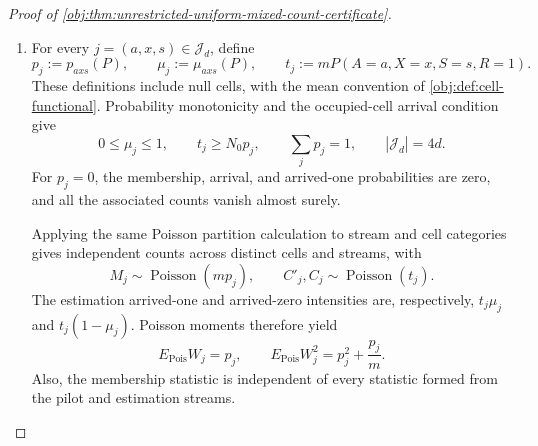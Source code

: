 \documentclass[11pt]{article}
\begin{document}
\begin{proof}[Proof of \cref{obj:thm:unrestricted-uniform-mixed-count-certificate}]
\begin{enumerate}
For the capped auxiliary output, conditional averaging gives
\[
\begin{aligned}
&E_\omega\!\left[
(\widetilde\tau(\mathbf O_n;\omega)-\Phi(P))^2
\mid\mathbf O_n\right]\\
&\quad=
(\widehat\tau^{\mathrm{mix}}_{n,d,q}(\mathbf O_n)-\Phi(P))^2
+
E_\omega\!\left[
(\widetilde\tau(\mathbf O_n;\omega)
-\widehat\tau^{\mathrm{mix}}_{n,d,q}(\mathbf O_n))^2
\mid\mathbf O_n\right].
\end{aligned}
\]
On each prefix-count fibre \(\nu\le n\), its stream law agrees with the
corresponding uncapped law. Summing these fibres, discarding the
nonnegative uncapped loss on the remaining fibres, and bounding the
overflow loss by four yields
\[
E_P\!\left[
(\widehat\tau^{\mathrm{mix}}_{n,d,q}-\Phi(P))^2
\right]
\le
E_{\mathrm{Pois}}\!\left[
(\widetilde\tau_{\mathrm{Pois}}-\Phi(P))^2
\right]+4\Pr(K_0>n).
\]
The Poisson probability series evaluates the exponential moment as
\[
E[2^{K_0}]
=e^{-n/2}\sum_{\nu=0}^{\infty}\frac{n^\nu}{\nu!}
=e^{n/2}.
\]
Since \(\{K_0>n\}\subseteq\{2^{K_0}\ge2^n\}\), exponential Markov gives
\[
\Pr(K_0>n)
\le\Pr(2^{K_0}\ge2^n)
\le2^{-n}E[2^{K_0}]
=e^{-n\log2+n/2}.
\]
Multiplying by \(e^{-n/2}\) cancels the intensity factor, so
\[
\Pr(K_0>n)e^{-n/2}
\le e^{-n\log2},
\qquad
\Pr(K_0>n)\le e^{-n\gamma_0}.
\]
Consequently,
\[
E_P\!\left[
(\widehat\tau^{\mathrm{mix}}_{n,d,q}-\Phi(P))^2
\right]
\le
E_{\mathrm{Pois}}\!\left[
(\widetilde\tau_{\mathrm{Pois}}-\Phi(P))^2
\right]+4e^{-n\gamma_0}.
\]
All these expectations are well defined; the capped sample space is finite
and the clipped outputs are bounded.

\item For every \(j=(a,x,s)\in\mathcal J_d\), define
\[
p_j:=p_{axs}(P),\qquad
\mu_j:=\mu_{axs}(P),\qquad
t_j:=mP(A=a,X=x,S=s,R=1).
\]
These definitions include null cells, with the mean convention of
\cref{obj:def:cell-functional}. Probability monotonicity and the
occupied-cell arrival condition give
\[
0\le\mu_j\le1,\qquad
t_j\ge N_0p_j,\qquad
\sum_jp_j=1,\qquad |\mathcal J_d|=4d.
\]
For \(p_j=0\), the membership, arrival, and arrived-one probabilities are
zero, and all the associated counts vanish almost surely.

Applying the same Poisson partition calculation to stream and cell
categories gives independent counts across distinct cells and streams,
with
\[
M_j\sim\operatorname{Poisson}(mp_j),
\qquad
C'_j,C_j\sim\operatorname{Poisson}(t_j).
\]
The estimation arrived-one and arrived-zero intensities are, respectively,
\(t_j\mu_j\) and \(t_j(1-\mu_j)\). Poisson moments therefore yield
\[
E_{\mathrm{Pois}}W_j=p_j,\qquad
E_{\mathrm{Pois}}W_j^2=p_j^2+\frac{p_j}{m}.
\]
Also, the membership statistic is independent of every statistic formed
from the pilot and estimation streams.


\end{enumerate}
\end{proof}
\end{document}
